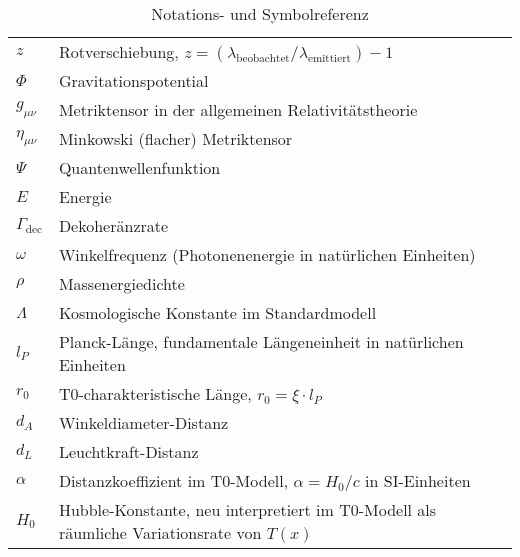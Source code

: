 \documentclass[12pt,a4paper]{article}
\newcommand{\Tfield}{T(x)}
\begin{document}
\begin{table}[h]
\begin{tabular}{>{\RaggedRight}p{} >{\RaggedRight}p{}}
			$z$ & Rotverschiebung, $z = (\lambda_{\text{beobachtet}} / \lambda_{\text{emittiert}}) - 1$ \\
			$\Phi$ & Gravitationspotential \\
			$g_{\mu\nu}$ & Metriktensor in der allgemeinen Relativitätstheorie \\
			$\eta_{\mu\nu}$ & Minkowski (flacher) Metriktensor \\
			$\Psi$ & Quantenwellenfunktion \\
			$E$ & Energie \\
			$\Gamma_{\text{dec}}$ & Dekoheränzrate \\
			$\omega$ & Winkelfrequenz (Photonenenergie in natürlichen Einheiten) \\
			$\rho$ & Massenergiedichte \\
			$\Lambda$ & Kosmologische Konstante im Standardmodell \\
			$l_P$ & Planck-Länge, fundamentale Längeneinheit in natürlichen Einheiten \\
			$r_0$ & T0-charakteristische Länge, $r_0 = \xi \cdot l_P$ \\
			$d_A$ & Winkeldiameter-Distanz \\
			$d_L$ & Leuchtkraft-Distanz \\
			$\alpha$ & Distanzkoeffizient im T0-Modell, $\alpha = H_0 / c$ in SI-Einheiten \\
			$H_0$ & Hubble-Konstante, neu interpretiert im T0-Modell als räumliche Variationsrate von $\Tfield$ \\
			\bottomrule
		\end{tabular}
		\caption{Notations- und Symbolreferenz}
	\end{table}
	
\end{document}
